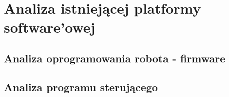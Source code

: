 \chapter{Analiza istniejącej platformy software'owej}
\section{Analiza oprogramowania robota - firmware}
\section{Analiza programu sterującego}
